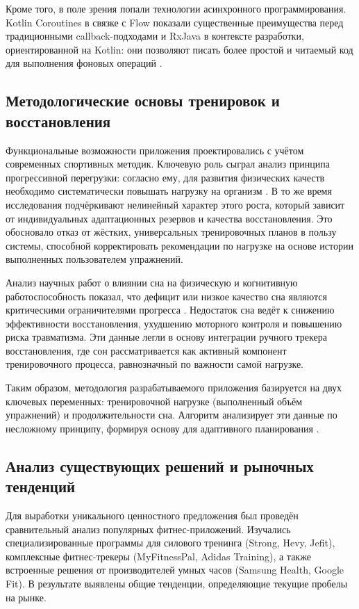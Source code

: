 Кроме того, в поле зрения попали технологии асинхронного программирования. Kotlin Coroutines в связке с Flow показали существенные преимущества перед традиционными callback-подходами и RxJava в контексте разработки, ориентированной на Kotlin: они позволяют писать более простой и читаемый код для выполнения фоновых операций \cite{refi}.

\subsection{Методологические основы тренировок и восстановления}

Функциональные возможности приложения проектировались с учётом современных спортивных методик. Ключевую роль сыграл анализ принципа прогрессивной перегрузки: согласно ему, для развития физических качеств необходимо систематически повышать нагрузку на организм \cite{refj}. В то же время исследования подчёркивают нелинейный характер этого роста, который зависит от индивидуальных адаптационных резервов и качества восстановления. Это обосновало отказ от жёстких, универсальных тренировочных планов в пользу системы, способной корректировать рекомендации по нагрузке на основе истории выполненных пользователем упражнений.

Анализ научных работ о влиянии сна на физическую и когнитивную работоспособность показал, что дефицит или низкое качество сна являются критическими ограничителями прогресса \cite{refk}. Недостаток сна ведёт к снижению эффективности восстановления, ухудшению моторного контроля и повышению риска травматизма. Эти данные легли в основу интеграции ручного трекера восстановления, где сон рассматривается как активный компонент тренировочного процесса, равнозначный по важности самой нагрузке.

Таким образом, методология разрабатываемого приложения базируется на двух ключевых переменных: тренировочной нагрузке (выполненный объём упражнений) и продолжительности сна. Алгоритм анализирует эти данные по несложному принципу, формируя основу для адаптивного планирования \cite{refj,refk}.

\subsection{Анализ существующих решений и рыночных тенденций}

Для выработки уникального ценностного предложения был проведён сравнительный анализ популярных фитнес-приложений. Изучались специализированные программы для силового тренинга (Strong, Hevy, Jefit), комплексные фитнес-трекеры (MyFitnessPal, Adidas Training), а также встроенные решения от производителей умных часов (Samsung Health, Google Fit). В результате выявлены общие тенденции, определяющие текущие пробелы на рынке.

